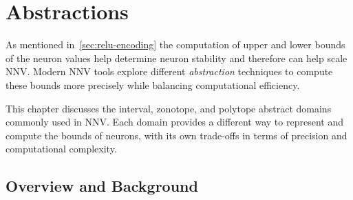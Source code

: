 \documentclass[oneside,11pt,dvipsnames]{book}
\numberwithin{equation}{section}
\theoremstyle{definition}
\theoremstyle{remark}
\newcommand{\tvn}[1]{\iftoggle{usecomment}{{\color{red}{[TVN]: #1}}}{}}
\newcommand{\hd}[1]{\iftoggle{usecomment}{{\color{blue}{[HD]: #1}}}{}}
\begin{document}
\chapter{Abstractions}\label{chap:abstractions}


As mentioned in~\autoref{sec:relu-encoding} the computation of upper and lower bounds of the neuron values help determine neuron stability and therefore can help scale NNV. Modern NNV tools explore different \emph{abstraction} techniques to compute these bounds more precisely while balancing computational efficiency.

This chapter discusses the interval, zonotope, and polytope abstract domains commonly used in NNV. Each domain provides a different way to represent and compute the bounds of neurons, with its own trade-offs in terms of precision and computational complexity.

\section{Overview and Background}



\end{document}

